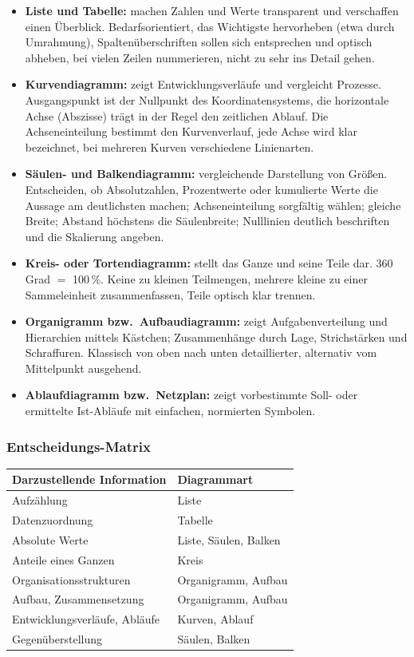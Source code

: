 \documentclass[12pt, a4paper]{article}
\begin{document}
\begin{itemize}
  \item \textbf{Liste und Tabelle:} machen Zahlen und Werte transparent und
        verschaffen einen Überblick. Bedarfsorientiert, das Wichtigste
        hervorheben (etwa durch Umrahmung), Spaltenüberschriften sollen sich
        entsprechen und optisch abheben, bei vielen Zeilen nummerieren,
        nicht zu sehr ins Detail gehen.
  \item \textbf{Kurvendiagramm:} zeigt Entwicklungsverläufe und vergleicht
        Prozesse. Ausgangspunkt ist der Nullpunkt des Koordinatensystems,
        die horizontale Achse (Abszisse) trägt in der Regel den zeitlichen
        Ablauf. Die Achseneinteilung bestimmt den Kurvenverlauf, jede Achse
        wird klar bezeichnet, bei mehreren Kurven verschiedene Linienarten.
  \item \textbf{Säulen- und Balkendiagramm:} vergleichende Darstellung von
        Größen. Entscheiden, ob Absolutzahlen, Prozentwerte oder kumulierte
        Werte die Aussage am deutlichsten machen; Achseneinteilung sorgfältig
        wählen; gleiche Breite; Abstand höchstens die Säulenbreite;
        Nulllinien deutlich beschriften und die Skalierung angeben.
  \item \textbf{Kreis- oder Tortendiagramm:} stellt das Ganze und seine Teile
        dar. 360 Grad $=$ 100\,\%. Keine zu kleinen Teilmengen, mehrere
        kleine zu einer \glqq Sammeleinheit\grqq{} zusammenfassen, Teile
        optisch klar trennen.
  \item \textbf{Organigramm bzw.\ Aufbaudiagramm:} zeigt Aufgabenverteilung
        und Hierarchien mittels Kästchen; Zusammenhänge durch Lage,
        Strichstärken und Schraffuren. Klassisch von oben nach unten
        detaillierter, alternativ vom Mittelpunkt ausgehend.
  \item \textbf{Ablaufdiagramm bzw.\ Netzplan:} zeigt vorbestimmte Soll- oder
        ermittelte Ist-Abläufe mit einfachen, normierten Symbolen.
\end{itemize}

\subsubsection{Entscheidungs-Matrix}

\begin{center}
\begin{tabular}{ll}
\textbf{Darzustellende Information} & \textbf{Diagrammart}\\\hline
Aufzählung & Liste\\
Datenzuordnung & Tabelle\\
Absolute Werte & Liste, Säulen, Balken\\
Anteile eines Ganzen & Kreis\\
Organisationsstrukturen & Organigramm, Aufbau\\
Aufbau, Zusammensetzung & Organigramm, Aufbau\\
Entwicklungsverläufe, Abläufe & Kurven, Ablauf\\
Gegenüberstellung & Säulen, Balken\\
\end{tabular}
\end{center}
\end{document}
